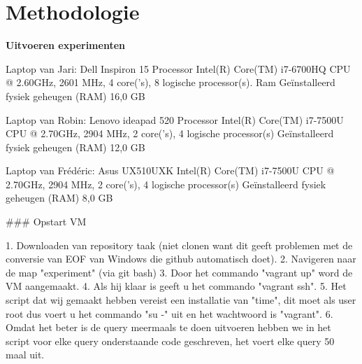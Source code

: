 \documentclass[fleqn,10pt]{artikeltin}
\begin{document}
\section{Methodologie}
\label{sec:methodologie}

\textbf{Uitvoeren experimenten}

Laptop van Jari: Dell Inspiron 15 
Processor Intel(R) Core(TM) i7-6700HQ CPU @ 2.60GHz, 2601 MHz, 4 core('s), 8 logische processor(s). 
Ram Geïnstalleerd fysiek geheugen (RAM)	16,0 GB

Laptop van Robin: Lenovo ideapad 520
Processor	Intel(R) Core(TM) i7-7500U CPU @ 2.70GHz, 2904 MHz, 2 core('s), 4 logische processor(s)
Geïnstalleerd fysiek geheugen (RAM)	12,0 GB

Laptop van Frédéric: Asus UX510UXK
Intel(R) Core(TM) i7-7500U CPU @ 2.70GHz, 2904 MHz, 2 core('s), 4 logische processor(s)
Geïnstalleerd fysiek geheugen (RAM)	8,0 GB

### Opstart VM

1. Downloaden van repository taak (niet clonen want dit geeft problemen met de conversie van EOF van Windows die github automatisch doet).
2. Navigeren naar de map "experiment" (via git bash)
3. Door het commando "vagrant up" word de VM aangemaakt.
4. Als hij klaar is geeft u het commando "vagrant ssh".
5. Het script dat wij gemaakt hebben vereist een installatie van "time", dit moet als user root dus voert u het commando "su -" uit en het wachtwoord is "vagrant".
6. Omdat het beter is de query meermaals te doen uitvoeren hebben we in het script voor elke query onderstaande code geschreven, het voert elke query 50 maal uit.
\end{document}
